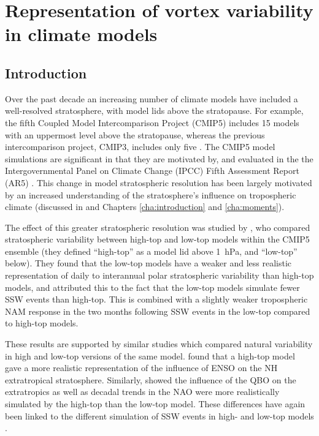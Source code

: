 \chapter{Representation of vortex variability in climate models}
\label{cha:models}


\section{Introduction}
\label{sec:models_introduction}

Over the past decade an increasing number of climate models have included a
well-resolved stratosphere, with model lids above the stratopause. For example,
the fifth Coupled Model Intercomparison Project (CMIP5) \citep{Taylor2012}
includes 15 models with an uppermost level above the stratopause, whereas the
previous intercomparison project, CMIP3, includes only five
\citep{Cordero2006}. The CMIP5 model simulations are significant in that they
are motivated by, and evaluated in the the Intergovernmental Panel on Climate
Change (IPCC) Fifth Assessment Report (AR5) \citep{Stocker2013}. This change in
model stratospheric resolution has been largely motivated by an increased
understanding of the stratosphere's influence on tropospheric climate (discussed
in \citet{Gerber2012} and Chapters \ref{cha:introduction} and
\ref{cha:moments}).

The effect of this greater stratospheric resolution was studied by
\citet{Charlton-Perez2013}, who compared stratospheric variability between
high-top and low-top models within the CMIP5 ensemble (they defined ``high-top''
as a model lid above 1~hPa, and ``low-top'' below). They found that the low-top
models have a weaker and less realistic representation of daily to interannual
polar stratospheric variability than high-top models, and attributed this to the
fact that the low-top models simulate fewer SSW events than high-top. This is
combined with a slightly weaker tropospheric NAM response in the two months
following SSW events in the low-top compared to high-top models.

These results are supported by similar studies which compared natural
variability in high and low-top versions of the same model. \citet{Cagnazzo2009}
found that a high-top model gave a more realistic representation of the
influence of ENSO on the NH extratropical stratosphere. Similarly,
\citet{Hardiman2012a} showed the influence of the QBO on the extratropics as
well as decadal trends in the NAO were more realistically simulated by the
high-top than the low-top model. These differences have again been linked to the
different simulation of SSW events in high- and low-top models
\citep{Sassi2010}.

